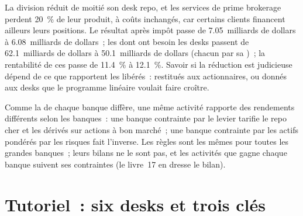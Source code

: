 \begin{example}\label{ex:fm:the-bank-markets-division:cut}
La division réduit de moitié son desk repo, et les services de prime brokerage perdent 20~\% de leur produit, à coûts inchangés, car certains clients financent
ailleurs leurs positions. Le résultat après impôt passe de 7.05~milliards de dollars à 6.08~milliards de dollars~; les  dont ont besoin les desks passent de 62.1~milliards de dollars à 50.1~milliards de dollars (chacun
par sa )~; la rentabilité de ces  passe de 11.4~\% à 12.1~\%. Savoir si la réduction est judicieuse dépend de ce que rapportent les  libérés~:
restitués aux actionnaires, ou donnés aux desks que le programme linéaire voulait faire croître.
\end{example}

\begin{remark}\label{rem:fm:the-bank-markets-division:special}
Comme la  de chaque banque diffère, une même activité rapporte des rendements différents selon les banques~: une banque contrainte par le levier tarifie le repo
cher et les dérivés sur actions à bon marché~; une banque contrainte par les actifs pondérés par les risques fait l'inverse. Les règles sont les mêmes pour toutes les grandes banques~; leurs
bilans ne le sont pas, et les activités que gagne chaque banque suivent ses contraintes (le livre~17 en dresse le bilan).
\end{remark}

\section{Tutoriel~: six desks et trois clés}\label{tut:fm:the-bank-markets-division:tut}

